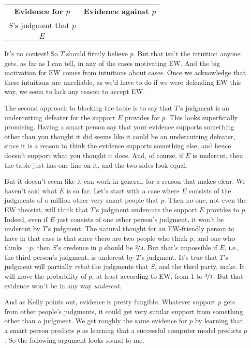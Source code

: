 \begin{center}
\begin{tabular}{c c}
\textbf{Evidence for $p$} & \textbf{Evidence against $p$} \\
$S$'s judgment that $p$ & \\
$E$ & \\
\end{tabular}
\end{center}

\noindent It's no contest! So $T$ should firmly believe $p$. But that isn't the intuition anyone gets, as far as I can tell, in any of the cases motivating EW. And the big motivation for EW comes from intuitions about cases. Once we acknowledge that these intuitions are unreliable, as we'd have to do if we were defending EW this way, we seem to lack any reason to accept EW.

The second approach to blocking the table is to say that $T$'s judgment is an undercutting defeater for the support $E$ provides for $p$. This looks superficially promising. Having a smart person say that your evidence supports something other than you thought it did seems like it could be an undercutting defeater, since it is a reason to think the evidence supports something else, and hence doesn't support what you thought it does. And, of course, if $E$ is undercut, then the table just has one line on it, and the two sides look equal.

But it doesn't seem like it can work in general, for a reason that \citet{Kelly2010-KELPDA} makes clear. We haven't said what $E$ is so far. Let's start with a case where $E$ consists of the judgments of a million other very smart people that $p$. Then no one, not even the EW theorist, will think that $T$'s judgment undercuts the support $E$ provides to $p$. Indeed, even if $E$ just consists of one other person's judgment, it won't be undercut by $T$'s judgment. The natural thought for an EW-friendly person to have in that case is that since there are two people who think $p$, and one who thinks $\neg p$, then $S$'s credence in $p$ should be $\nicefrac{2}{3}$. But that's impossible if $E$, i.e., the third person's judgment, is undercut by $T$'s judgment. It's true that $T$'s judgment will partially \textit{rebut} the judgments that $S$, and the third party, make. It will move the probability of $p$, at least according to EW, from 1 to $\nicefrac{2}{3}$. But that evidence won't be in any way \textit{undercut}.

And as Kelly points out, evidence is pretty fungible. Whatever support $p$ gets from other people's judgments, it could get very similar support from something other than a judgment. We get roughly the same evidence for $p$ by learning that a smart person predicts $p$ as learning that a successful computer model predicts $p$. So the following argument looks sound to me.


